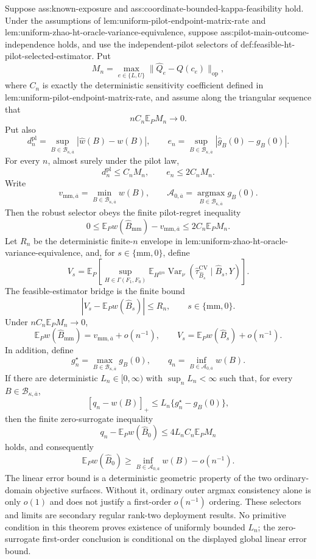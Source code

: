 Suppose ass:known-exposure and ass:coordinate-bounded-kappa-feasibility hold.  Under the assumptions of lem:uniform-pilot-endpoint-matrix-rate and lem:uniform-zhao-ht-oracle-variance-equivalence, suppose ass:pilot-main-outcome-independence holds, and use the independent-pilot selectors of def:feasible-ht-pilot-selected-estimator.  Put
\[
M_n=\max_{e\in\{L,U\}}\lVert\widehat Q_e-Q(c_e)\rVert_{\mathrm{op}},
\]
where \(C_n\) is exactly the deterministic sensitivity coefficient defined in lem:uniform-pilot-endpoint-matrix-rate, and assume along the triangular sequence that
\[
nC_n\mathbb E_PM_n\longrightarrow0.
\]
Put also
\[
d_n^{\mathrm{pl}}=\sup_{B\in\mathcal B_{\kappa,\overline a}}|\widehat w(B)-w(B)|,
\qquad
e_n=\sup_{B\in\mathcal B_{\kappa,\overline a}}|\widehat g_B(0)-g_B(0)|.
\]
For every \(n\), almost surely under the pilot law,
\[
d_n^{\mathrm{pl}}\le C_nM_n,
\qquad e_n\le2C_nM_n.
\]
Write
\[
v_{\mathrm{mm},\overline a}=\min_{B\in\mathcal B_{\kappa,\overline a}}w(B),
\qquad
\mathcal A_{0,\overline a}=\operatorname*{argmax}_{B\in\mathcal B_{\kappa,\overline a}}g_B(0).
\]
Then the robust selector obeys the finite pilot-regret inequality
\[
0\le
\mathbb E_Pw(\widehat B_{\mathrm{mm}})-v_{\mathrm{mm},\overline a}
\le2C_n\mathbb E_PM_n.
\]
Let \(R_n\) be the deterministic finite-\(n\) envelope in lem:uniform-zhao-ht-oracle-variance-equivalence, and, for \(s\in\{\mathrm{mm},0\}\), define
\[
V_s=
\mathbb E_P\left[
\sup_{H\in\Gamma(F_1,F_0)}
\mathbb E_{H^{\otimes n}}
\operatorname{Var}_\nu
(\widehat\tau_{\widehat B_s}^{\mathrm{CV}}\mid\widehat B_s,Y)
\right].
\]
The feasible-estimator bridge is the finite bound
\[
|V_s-\mathbb E_Pw(\widehat B_s)|\le R_n,
\qquad s\in\{\mathrm{mm},0\}.
\]
Under \(nC_n\mathbb E_PM_n\to0\),
\[
\mathbb E_Pw(\widehat B_{\mathrm{mm}})
=v_{\mathrm{mm},\overline a}+o(n^{-1}),
\qquad
V_s=\mathbb E_Pw(\widehat B_s)+o(n^{-1}).
\]
In addition, define
\[
g_n^\star=\max_{B\in\mathcal B_{\kappa,\overline a}}g_B(0),
\qquad
q_n=\inf_{B\in\mathcal A_{0,\overline a}}w(B).
\]
If there are deterministic \(L_n\in[0,\infty)\) with \(\sup_nL_n<\infty\) such that, for every \(B\in\mathcal B_{\kappa,\overline a}\),
\[
[q_n-w(B)]_+\le L_n\{g_n^\star-g_B(0)\},
\]
then the finite zero-surrogate inequality
\[
q_n-\mathbb E_Pw(\widehat B_0)
\le4L_nC_n\mathbb E_PM_n
\]
holds, and consequently
\[
\mathbb E_Pw(\widehat B_0)
\ge\inf_{B\in\mathcal A_{0,\overline a}}w(B)-o(n^{-1}).
\]
The linear error bound is a deterministic geometric property of the two ordinary-domain objective surfaces.  Without it, ordinary outer argmax consistency alone is only \(o(1)\) and does not justify a first-order \(o(n^{-1})\) ordering.  These selectors and limits are secondary regular rank-two deployment results.  No primitive condition in this theorem proves existence of uniformly bounded \(L_n\); the zero-surrogate first-order conclusion is conditional on the displayed global linear error bound.